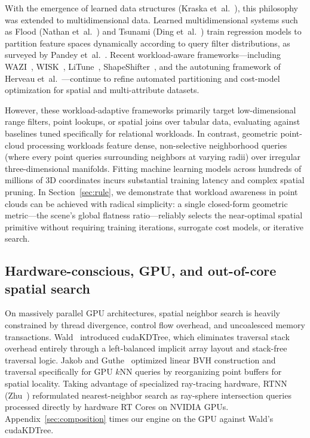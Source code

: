 With the emergence of learned data structures (Kraska et~al.~\cite{kraska2018learned}), this philosophy was extended to multidimensional data. Learned multidimensional systems such as Flood (Nathan et~al.~\cite{nathan2020flood}) and Tsunami (Ding et~al.~\cite{ding2020tsunami}) train regression models to partition feature spaces dynamically according to query filter distributions, as surveyed by Pandey et~al.~\cite{pandey2020learnedspatial}. Recent workload-aware frameworks---including WAZI~\cite{pai2023wazi}, WISK~\cite{sheng2023wisk}, LiTune~\cite{wang2025litune}, ShapeShifter~\cite{wang2025shapeshifter}, and the autotuning framework of Herveau et~al.~\cite{herveau2023autotuning}---continue to refine automated partitioning and cost-model optimization for spatial and multi-attribute datasets.

However, these workload-adaptive frameworks primarily target low-dimensional range filters, point lookups, or spatial joins over tabular data, evaluating against baselines tuned specifically for relational workloads. In contrast, geometric point-cloud processing workloads feature dense, non-selective neighborhood queries (where every point queries surrounding neighbors at varying radii) over irregular three-dimensional manifolds. Fitting machine learning models across hundreds of millions of 3D coordinates incurs substantial training latency and complex spatial pruning. In Section~\ref{sec:rule}, we demonstrate that workload awareness in point clouds can be achieved with radical simplicity: a single closed-form geometric metric---the scene's global flatness ratio---reliably selects the near-optimal spatial primitive without requiring training iterations, surrogate cost models, or iterative search.

\subsection{Hardware-conscious, GPU, and out-of-core spatial search}

On massively parallel GPU architectures, spatial neighbor search is heavily constrained by thread divergence, control flow overhead, and uncoalesced memory transactions. Wald~\cite{wald2022cudakdtree} introduced cudaKDTree, which eliminates traversal stack overhead entirely through a left-balanced implicit array layout and stack-free traversal logic. Jakob and Guthe~\cite{jakob2021lbvhknn} optimized linear BVH construction and traversal specifically for GPU $k$NN queries by reorganizing point buffers for spatial locality. Taking advantage of specialized ray-tracing hardware, RTNN (Zhu~\cite{zhu2022rtnn}) reformulated nearest-neighbor search as ray-sphere intersection queries processed directly by hardware RT Cores on NVIDIA GPUs. Appendix~\ref{sec:composition} times our engine on the GPU against Wald's cudaKDTree.

